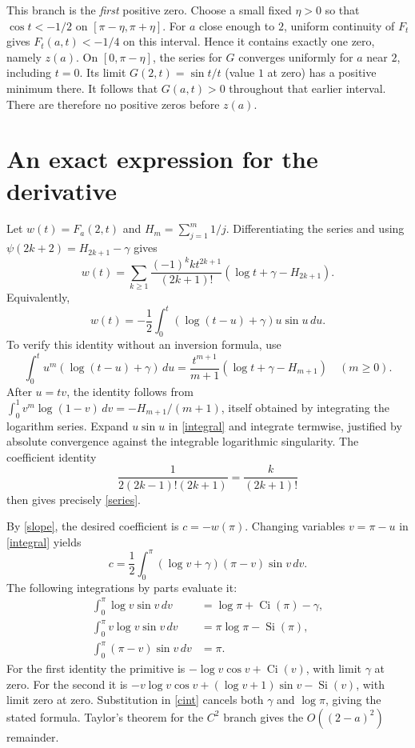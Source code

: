 \documentclass[11pt]{article}
\newcommand{\Si}{\operatorname{Si}}
\newcommand{\Ci}{\operatorname{Ci}}
\begin{document}
This branch is the \emph{first} positive zero. Choose a small fixed
$\eta>0$ so that $\cos t<-1/2$ on $[\pi-\eta,\pi+\eta]$.
For $a$ close enough to $2$, uniform continuity of $F_t$ gives
$F_t(a,t)<-1/4$ on this interval. Hence it contains exactly one zero,
namely $z(a)$. On $[0,\pi-\eta]$, the series for $G$ converges
uniformly for $a$ near $2$, including $t=0$. Its limit
$G(2,t)=\sin t/t$ (value $1$ at zero) has a positive minimum there.
It follows that $G(a,t)>0$ throughout that earlier interval. There
are therefore no positive zeros before $z(a)$.

\section*{An exact expression for the derivative}
Let $w(t)=F_a(2,t)$ and $H_m=\sum_{j=1}^m1/j$. Differentiating the
series and using $\psi(2k+2)=H_{2k+1}-\gamma$ gives
\begin{equation}\label{series}
 w(t)=\sum_{k\geq1}\frac{(-1)^k k t^{2k+1}}{(2k+1)!}
               (\log t+\gamma-H_{2k+1}).
\end{equation}
Equivalently,
\begin{equation}\label{integral}
 w(t)=-\frac12\int_0^t(\log(t-u)+\gamma)u\sin u\,du.
\end{equation}
To verify this identity without an inversion formula, use
\[
 \int_0^t u^m(\log(t-u)+\gamma)\,du
 =\frac{t^{m+1}}{m+1}(\log t+\gamma-H_{m+1})
 \quad(m\geq0).
\]
After $u=tv$, the identity follows from
$\int_0^1v^m\log(1-v)\,dv=-H_{m+1}/(m+1)$, itself obtained by
integrating the logarithm series. Expand $u\sin u$ in
\eqref{integral} and integrate termwise, justified by absolute
convergence against the integrable logarithmic singularity.
The coefficient identity
\[
 \frac{1}{2(2k-1)!(2k+1)}=\frac{k}{(2k+1)!}
\]
then gives precisely \eqref{series}.

By \eqref{slope}, the desired coefficient is $c=-w(\pi)$. Changing
variables $v=\pi-u$ in \eqref{integral} yields
\begin{equation}\label{cint}
 c=\frac12\int_0^\pi(\log v+\gamma)(\pi-v)\sin v\,dv.
\end{equation}
The following integrations by parts evaluate it:
\begin{align*}
 \int_0^\pi\log v\sin v\,dv&=\log\pi+\Ci(\pi)-\gamma,\\
 \int_0^\pi v\log v\sin v\,dv&=\pi\log\pi-\Si(\pi),\\
 \int_0^\pi(\pi-v)\sin v\,dv&=\pi.
\end{align*}
For the first identity the primitive is
$-\log v\cos v+\Ci(v)$, with limit $\gamma$ at zero. For the
second it is $-v\log v\cos v+(\log v+1)\sin v-\Si(v)$, with
limit zero at zero. Substitution in \eqref{cint} cancels both
$\gamma$ and $\log\pi$, giving the stated formula. Taylor's theorem
for the $C^2$ branch gives the $O((2-a)^2)$ remainder.
\end{document}
